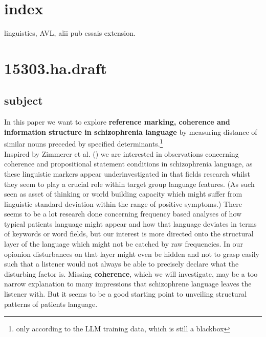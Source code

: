 \documentclass[12pt,a4paper]{article}
\begin{document}

\vspace{1cm}

\chapter{index}\label{index}

linguistics, AVL, alii pub essais extension.

\begin{Shaded}
\begin{Highlighting}[]
\end{Highlighting}
\end{Shaded}

\chapter{15303.ha.draft}\label{ha.draft}

\section{subject}\label{subject}

In this paper we want to explore \textbf{reference marking, coherence and information structure in schizophrenia language} by measuring distance of similar nouns preceded by specified determinants.\footnote{only according to the LLM training data, which is still a blackbox}\\
Inspired by Zimmerer et al. () we are interested in observations concerning coherence and propositional statement conditions in schizophrenia language, as these linguistic markers appear underinvestigated in that fields research whilst they seem to play a crucial role within target group language features. (As such seen as asset of thinking or world building capacity which might suffer from linguistic standard deviation within the range of positive symptoms.) There seems to be a lot research done concerning frequency based analyses of how typical patients language might appear and how that language deviates in terms of keywords or word fields, but our interest is more directed onto the structural layer of the language which might not be catched by raw frequencies. In our opionion disturbances on that layer might even be hidden and not to grasp easily such that a listener would not always be able to precisely declare what the disturbing factor is. Missing \textbf{coherence}, which we will investigate, may be a too narrow explanation to many impressions that schizophrene language leaves the listener with. But it seems to be a good starting point to unveiling structural patterns of patients language.
\end{document}
